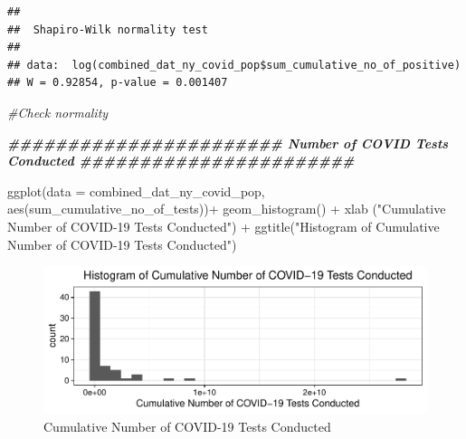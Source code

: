 \documentclass[
  12pt,
]{article}
\newenvironment{Shaded}{\begin{snugshade}}{\end{snugshade}}
\newcommand{\AttributeTok}[1]{\textcolor[rgb]{0.77,0.63,0.00}{#1}}
\newcommand{\CommentTok}[1]{\textcolor[rgb]{0.56,0.35,0.01}{\textit{#1}}}
\newcommand{\DocumentationTok}[1]{\textcolor[rgb]{0.56,0.35,0.01}{\textbf{\textit{#1}}}}
\newcommand{\FunctionTok}[1]{\textcolor[rgb]{0.00,0.00,0.00}{#1}}
\newcommand{\NormalTok}[1]{#1}
\newcommand{\SpecialCharTok}[1]{\textcolor[rgb]{0.00,0.00,0.00}{#1}}
\newcommand{\StringTok}[1]{\textcolor[rgb]{0.31,0.60,0.02}{#1}}
\begin{document}
\begin{Shaded}
\end{Shaded}

\begin{verbatim}
## 
##  Shapiro-Wilk normality test
## 
## data:  log(combined_dat_ny_covid_pop$sum_cumulative_no_of_positive)
## W = 0.92854, p-value = 0.001407
\end{verbatim}

\begin{Shaded}
\begin{Highlighting}[]
\CommentTok{\#Check normality}
\end{Highlighting}
\end{Shaded}

\begin{Shaded}
\begin{Highlighting}[]
\DocumentationTok{\#\#\#\#\#\#\#\#\#\#\#\#\#\#\#\#\#\#\#\#\#\#\# Number of COVID Tests Conducted \#\#\#\#\#\#\#\#\#\#\#\#\#\#\#\#\#\#\#\#\#\#\#}

\FunctionTok{ggplot}\NormalTok{(}\AttributeTok{data =}\NormalTok{ combined\_dat\_ny\_covid\_pop, }\FunctionTok{aes}\NormalTok{(sum\_cumulative\_no\_of\_tests))}\SpecialCharTok{+}
  \FunctionTok{geom\_histogram}\NormalTok{() }\SpecialCharTok{+}
  \FunctionTok{xlab}\NormalTok{ (}\StringTok{"Cumulative Number of COVID{-}19 Tests Conducted"}\NormalTok{) }\SpecialCharTok{+}
  \FunctionTok{ggtitle}\NormalTok{(}\StringTok{"Histogram of Cumulative Number of COVID{-}19 Tests Conducted"}\NormalTok{)}
\end{Highlighting}
\end{Shaded}

\begin{figure}

{\centering \includegraphics{EDA_Final_Group_Project_files/figure-latex/unnamed-chunk-6-1} 

}

\caption{Cumulative Number of COVID-19 Tests Conducted}\label{fig:unnamed-chunk-6}
\end{figure}
\end{document}
